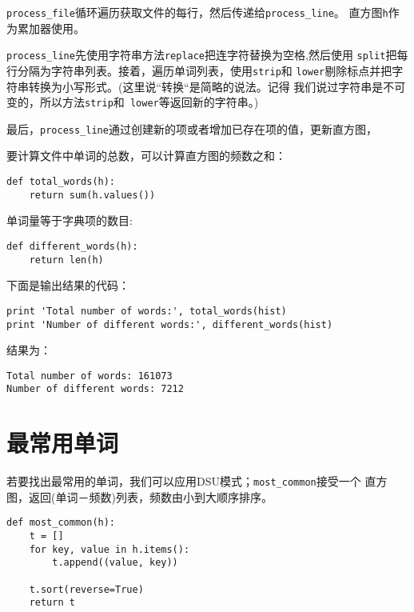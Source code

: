 
\verb"process_file"循环遍历获取文件的每行，然后传递给\verb"process_line"。
直方图{\tt h}作为累加器使用。


\verb"process_line"先使用字符串方法{\tt replace}把连字符替换为空格,然后使用
{\tt split}把每行分隔为字符串列表。接着，遍历单词列表，使用{\tt strip}和
{\tt lower}剔除标点并把字符串转换为小写形式。(这里说“转换“是简略的说法。记得
		我们说过字符串是不可变的，所以方法{\tt strip}和{\tt
		lower}等返回新的字符串。)

最后，\verb"process_line"通过创建新的项或者增加已存在项的值，更新直方图，


要计算文件中单词的总数，可以计算直方图的频数之和：

\beforeverb
\begin{verbatim}
def total_words(h):
    return sum(h.values())
\end{verbatim}
\afterverb
%

单词量等于字典项的数目:

\beforeverb
\begin{verbatim}
def different_words(h):
    return len(h)
\end{verbatim}
\afterverb
%

下面是输出结果的代码：

\beforeverb
\begin{verbatim}
print 'Total number of words:', total_words(hist)
print 'Number of different words:', different_words(hist)
\end{verbatim}
\afterverb
%

结果为：

\beforeverb
\begin{verbatim}
Total number of words: 161073
Number of different words: 7212
\end{verbatim}
\afterverb
%

\section{最常用单词}


若要找出最常用的单词，我们可以应用DSU模式；\verb"most_common"接受一个
直方图，返回(单词－频数)列表，频数由小到大顺序排序。

\beforeverb
\begin{verbatim}
def most_common(h):
    t = []
    for key, value in h.items():
        t.append((value, key))

    t.sort(reverse=True)
    return t
\end{verbatim}
\afterverb
%


